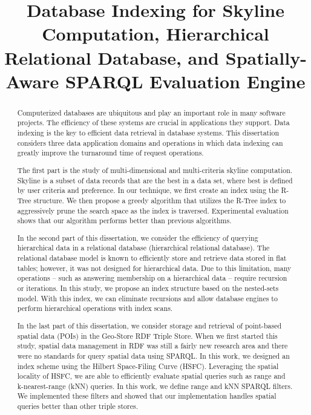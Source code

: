 \documentclass[12pt]{report}
\title{Database Indexing for Skyline Computation, Hierarchical Relational Database, and Spatially-Aware SPARQL Evaluation Engine}
\begin{document}
\begin{romanpages}      %

\TitlePage 

\begin{abstract}
Computerized databases are ubiquitous and play an important role in many software projects. The efficiency of these systems are crucial in applications they support. Data indexing is the key to efficient data retrieval in database systems. This dissertation considers three data application domains and operations in which data indexing can greatly improve the turnaround time of request operations.

The first part is the study of multi-dimensional and multi-criteria skyline computation. Skyline is a subset of data records that are the best in a data set, where best is defined by user criteria and preference. In our technique, we first create an index using the R-Tree structure. We then propose a greedy algorithm that utilizes the R-Tree index to aggressively prune the search space as the index is traversed. Experimental evaluation shows that our algorithm performs better than previous algorithms.

In the second part of this dissertation, we consider the efficiency of querying hierarchical data in a relational database (hierarchical relational database). The relational database model is known to efficiently store and retrieve data stored in flat tables; however, it was not designed for hierarchical data. Due to this limitation, many operations -- such as answering membership on a hierarchical data -- require recursion or iterations. In this study, we propose an index structure based on the nested-sets model. With this index, we can eliminate recursions and allow database engines to perform hierarchical operations with index scans.

In the last part of this dissertation, we consider storage and retrieval of point-based spatial data (POIs) in the Geo-Store RDF Triple Store. When we first started this study, spatial data management in RDF was still a fairly new research area and there were no standards for query spatial data using SPARQL. In this work, we designed an index scheme using the Hilbert Space-Filing Curve (HSFC). Leveraging the spatial locality of HSFC, we are able to efficiently evaluate spatial queries such as range and k-nearest-range (kNN) queries. In this work, we define range and kNN SPARQL filters. We implemented these filters and showed that our implementation handles spatial queries better than other triple stores.
\end{abstract}


\end{romanpages}
\end{document}
